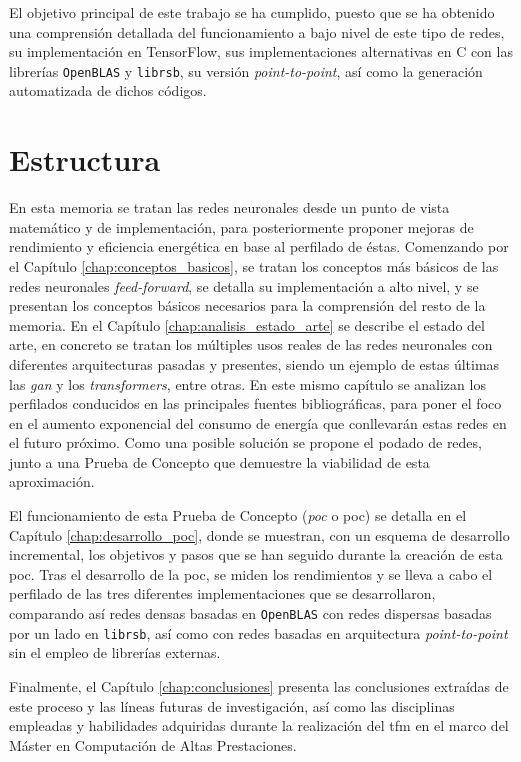 El objetivo principal de este trabajo se ha cumplido, puesto que se ha obtenido una comprensión detallada del funcionamiento a bajo nivel de este tipo de redes, su implementación en TensorFlow, sus implementaciones alternativas en C con las librerías \texttt{OpenBLAS} y \texttt{librsb}, su versión \textit{point-to-point}, así como la generación automatizada de dichos códigos.

\section{Estructura}
\label{sec:estructura}
En esta memoria se tratan las redes neuronales desde un punto de vista matemático y de implementación, para posteriormente proponer mejoras de rendimiento y eficiencia energética en base al perfilado de éstas. Comenzando por el Capítulo \ref{chap:conceptos_basicos}, se tratan los conceptos más básicos de las redes neuronales \textit{feed-forward}, se detalla su implementación a alto nivel, y se presentan los conceptos básicos necesarios para la comprensión del resto de la memoria. En el Capítulo \ref{chap:analisis_estado_arte} se describe el estado del arte, en concreto se tratan los múltiples usos reales de las redes neuronales con diferentes arquitecturas pasadas y presentes, siendo un ejemplo de estas últimas las \textit{\acrlong{gan}} y los \textit{transformers}, entre otras. En este mismo capítulo se analizan los perfilados conducidos en las principales fuentes bibliográficas, para poner el foco en el aumento exponencial del consumo de energía que conllevarán estas redes en el futuro próximo. Como una posible solución se propone el podado de redes, junto a una Prueba de Concepto que demuestre la viabilidad de esta aproximación.

El funcionamiento de esta Prueba de Concepto (\textit{\acrlong{poc}} o \acrshort{poc}) se detalla en el Capítulo \ref{chap:desarrollo_poc}, donde se muestran, con un esquema de desarrollo incremental, los objetivos y pasos que se han seguido durante la creación de esta \acrshort{poc}. Tras el desarrollo de la \acrshort{poc}, se miden los rendimientos y se lleva a cabo el perfilado de las tres diferentes implementaciones que se desarrollaron, comparando así redes densas basadas en \texttt{OpenBLAS} con redes dispersas basadas por un lado en \texttt{librsb}, así como con redes basadas en arquitectura \textit{point-to-point} sin el empleo de librerías externas.

Finalmente, el Capítulo \ref{chap:conclusiones} presenta las conclusiones extraídas de este proceso y las líneas futuras de investigación, así como las disciplinas empleadas y habilidades adquiridas durante la realización del \acrshort{tfm} en el marco del Máster en Computación de Altas Prestaciones.